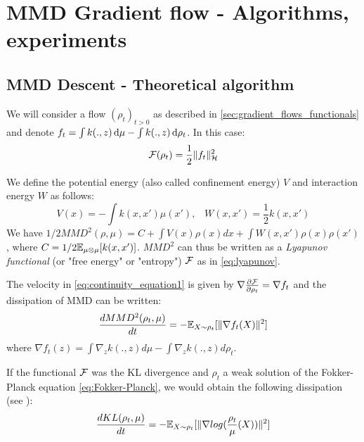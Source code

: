 \section{MMD Gradient flow - Algorithms, experiments}\label{sec:mmd_flow}

\subsection{MMD Descent - Theoretical algorithm}

We will consider a flow $(\rho_t)_{t>0}$ as described in \cref{sec:gradient_flows_functionals} and denote $f_t= \int k(.,z)\mathop{}\!\mathrm{d} \mu - \int k(.,z)\mathop{}\!\mathrm{d} \rho_t$. In this case:
\begin{equation}
{{\mathcal F}}(\rho_t)=\frac{1}{2}\|f_t\|^2_{{{\mathcal H}}}
\end{equation} 

We define the potential energy (also called confinement energy) $V$ and interaction energy $W$ as follows:
\begin{equation}
V(x)=-\int  k(x,x')\mu(x')\text{,} \quad
W(x,x')=\frac{1}{2}k(x,x')
\end{equation}
We have $1/2MMD^2(\rho,\mu)=C+ \int V(x) \rho(x)dx + \int W(x,x')\rho(x)\rho(x')$, where $C=1/2{{\mathbb E}}_{\mu\otimes \mu}[k(x,x')]$. $MMD^2$ can thus be written as a \textit{Lyapunov functional} (or "free energy" or "entropy") ${{\mathcal F}}$ as in \eqref{eq:lyapunov}.



\begin{proposition}\label{prop:mmd_flow}
 The velocity in \eqref{eq:continuity_equation1} is given by $\nabla \frac{\partial{{{\mathcal F}}}}{\partial{\rho_t}}=\nabla f_t$ and the dissipation of MMD can be written:  
	\begin{equation}
	\frac{d MMD^2(\rho_t, \mu)}{dt}=-{{\mathbb E}}_{X \sim \rho_t}[\|\nabla f_t(X)\|^2]
	\end{equation}
	where $\nabla f_t(z)= \int \nabla_{z}k(.,z) d\mu -  \int \nabla_{z}k(.,z) d\rho_t$.
\end{proposition}

\begin{remark}
	If the functional ${{\mathcal F}}$ was the KL divergence and $\rho_t$ a weak solution of the Fokker-Planck equation \eqref{eq:Fokker-Planck}, we would obtain the following dissipation (see \cite{wibisono2018sampling}):
	\begin{equation}
	\frac{d KL(\rho_t, \mu)}{dt}=-{{\mathbb E}}_{X \sim \rho_t}[\|\nabla log(\frac{\rho_t}{\mu}(X))\|^2]
	\end{equation}
\end{remark}


